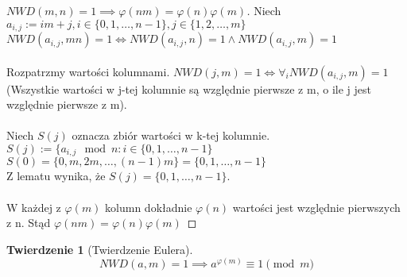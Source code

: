 \documentclass{article}
\theoremstyle{break}
\newtheorem{theorem}{Twierdzenie}
\newtheorem{proof}{Dowód}
\begin{document}
\begin{proof}[$NWD(m,n) = 1 \implies \varphi(nm) = \varphi(n) \varphi(m)$]
Niech $a_{i,j} := im + j, i \in \{0, 1, \dots, n-1 \}, j \in \{1, 2, \dots, m \}$ \\
$NWD(a_{i,j}, mn) = 1 \iff NWD(a_{i,j}, n) = 1 \land NWD(a_{i,j}, m) = 1 $ \\ \\
Rozpatrzmy wartości kolumnami. 
$NWD(j, m) = 1 \iff \forall_i NWD(a_{i,j}, m) = 1$ \\
(Wszystkie wartości w j-tej kolumnie są względnie pierwsze z m, o ile j jest względnie pierwsze z m). \\ \\
Niech $S(j)$ oznacza zbiór wartości w k-tej kolumnie. \\
$S(j) := \{ a_{i, j} \mod{n} : i \in \{0, 1, \dots, n-1 \} $ \\
$S(0) = \{0, m, 2m, \dots, (n-1)m \} = \{0, 1, \dots, n-1 \}$ \\
Z lematu wynika, że $S(j) = \{0, 1, \dots, n-1 \}$. \\ \\
W każdej z $\varphi(m)$ kolumn dokładnie $\varphi(n)$ wartości jest względnie pierwszych z n. Stąd $\varphi(nm) = \varphi(n)\varphi(m)$
\end{proof}

\begin{theorem}[Twierdzenie Eulera]
\begin{displaymath}
NWD(a,m) = 1 \implies a^{\varphi(m)} \equiv 1 \pmod{m}
\end{displaymath}
\end{theorem}
\end{document}

